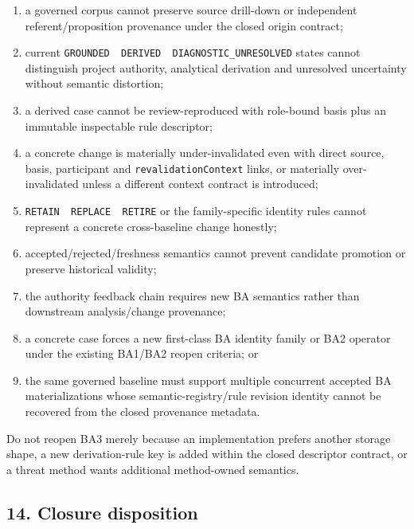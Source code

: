 \documentclass[11pt,a4paper]{article}
\providecommand{\tightlist}{\setlength{\itemsep}{0pt}\setlength{\parskip}{0pt}}
\begin{document}
\begin{enumerate}
\def\labelenumi{\arabic{enumi}.}
\tightlist
\item
  a governed corpus cannot preserve source drill-down or independent referent/proposition provenance under the closed origin contract;
\item
  current \texttt{GROUNDED\ \textbar{}\ DERIVED\ \textbar{}\ DIAGNOSTIC\_UNRESOLVED} states cannot distinguish project authority, analytical derivation and unresolved uncertainty without semantic distortion;
\item
  a derived case cannot be review-reproduced with role-bound basis plus an immutable inspectable rule descriptor;
\item
  a concrete change is materially under-invalidated even with direct source, basis, participant and \texttt{revalidationContext} links, or materially over-invalidated unless a different context contract is introduced;
\item
  \texttt{RETAIN\ \textbar{}\ REPLACE\ \textbar{}\ RETIRE} or the family-specific identity rules cannot represent a concrete cross-baseline change honestly;
\item
  accepted/rejected/freshness semantics cannot prevent candidate promotion or preserve historical validity;
\item
  the authority feedback chain requires new BA semantics rather than downstream analysis/change provenance;
\item
  a concrete case forces a new first-class BA identity family or BA2 operator under the existing BA1/BA2 reopen criteria; or
\item
  the same governed baseline must support multiple concurrent accepted BA materializations whose semantic-registry/rule revision identity cannot be recovered from the closed provenance metadata.
\end{enumerate}

Do not reopen BA3 merely because an implementation prefers another storage shape, a new derivation-rule key is added within the closed descriptor contract, or a threat method wants additional method-owned semantics.

\subsection{14. Closure disposition}\label{closure-disposition}
\end{document}
